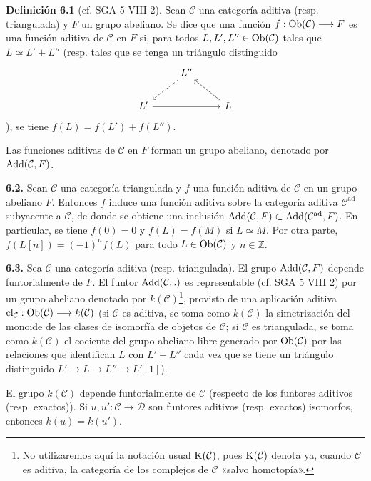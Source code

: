 \textbf{Definición 6.1} (cf. SGA 5 VIII 2). Sean \(\mathcal C\) una categoría aditiva (resp. triangulada) y \(F\) un grupo abeliano. Se dice que una función \(f:\operatorname{Ob}(\mathcal C)\longrightarrow F\) es una función aditiva de \(\mathcal C\) en \(F\) si, para todos \(L,L',L''\in\operatorname{Ob}(\mathcal C)\) tales que \(L\simeq L'+L''\) (resp. tales que se tenga un triángulo distinguido
\[
\begin{tikzcd}
& L'' \arrow[dl, dashed] & \\
L' \arrow[rr] && L \arrow[ul]
\end{tikzcd}
\]
), se tiene \(f(L)=f(L')+f(L'')\).

Las funciones aditivas de \(\mathcal C\) en \(F\) forman un grupo abeliano, denotado por \(\operatorname{Add}(\mathcal C,F)\).

\textbf{6.2.} Sean \(\mathcal C\) una categoría triangulada y \(f\) una función aditiva de \(\mathcal C\) en un grupo abeliano \(F\). Entonces \(f\) induce una función aditiva sobre la categoría aditiva \(\mathcal C^{\mathrm{ad}}\) subyacente a \(\mathcal C\), de donde se obtiene una inclusión \(\operatorname{Add}(\mathcal C,F)\subset\operatorname{Add}(\mathcal C^{\mathrm{ad}},F)\). En particular, se tiene \(f(0)=0\) y \(f(L)=f(M)\) si \(L\simeq M\). Por otra parte, \(f(L[n])=(-1)^n f(L)\) para todo \(L\in\operatorname{Ob}(\mathcal C)\) y \(n\in\mathbb Z\).

\textbf{6.3.} Sea \(\mathcal C\) una categoría aditiva (resp. triangulada). El grupo \(\operatorname{Add}(\mathcal C,F)\) depende funtorialmente de \(F\). El funtor \(\operatorname{Add}(\mathcal C,.)\) es representable (cf. SGA 5 VIII 2) por un grupo abeliano denotado por \(k(\mathcal C)\)\footnote{No utilizaremos aquí la notación usual \(\mathrm K(\mathcal C)\), pues \(\mathrm K(\mathcal C)\) denota ya, cuando \(\mathcal C\) es aditiva, la categoría de los complejos de \(\mathcal C\) «salvo homotopía».}, provisto de una aplicación aditiva \(\operatorname{cl}_{\mathcal C}:\operatorname{Ob}(\mathcal C)\longrightarrow k(\mathcal C)\) (si \(\mathcal C\) es aditiva, se toma como \(k(\mathcal C)\) la simetrización del monoide de las clases de isomorfía de objetos de \(\mathcal C\); si \(\mathcal C\) es triangulada, se toma como \(k(\mathcal C)\) el cociente del grupo abeliano libre generado por \(\operatorname{Ob}(\mathcal C)\) por las relaciones que identifican \(L\) con \(L'+L''\) cada vez que se tiene un triángulo distinguido \(L'\longrightarrow L\longrightarrow L''\longrightarrow L'[1]\)).

El grupo \(k(\mathcal C)\) depende funtorialmente de \(\mathcal C\) (respecto de los funtores aditivos (resp. exactos)). Si \(u,u':\mathcal C\to\mathcal D\) son funtores aditivos (resp. exactos) isomorfos, entonces \(k(u)=k(u')\).

